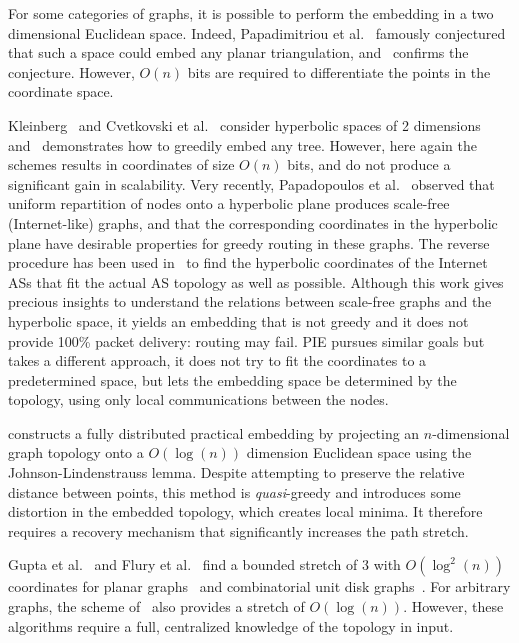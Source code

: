 \documentclass[conference]{IEEEtran}
\begin{document}
For some categories of graphs, it is possible to perform the embedding in a two dimensional Euclidean space. Indeed, Papadimitriou et al.~\cite{papadimitriou:conjecture} famously conjectured that such a space could embed any planar triangulation, and~\cite{moitra:greedy} confirms the conjecture. However, $O(n)$ bits are required to differentiate the points in the coordinate space.

Kleinberg~\cite{kleinberg:hyperbolic} and Cvetkovski et al.~\cite{Crovella:hyperbolic} consider hyperbolic spaces of 2 dimensions and~\cite{kleinberg:hyperbolic} demonstrates how to greedily embed any tree. However, here again the schemes results in coordinates of size $O(n)$ bits, and do not produce a significant gain in scalability. 
Very recently, Papadopoulos et al.~\cite{papadopoulos10} observed that uniform repartition of nodes onto a hyperbolic plane produces scale-free (Internet-like) graphs, and that the corresponding coordinates in the hyperbolic plane have desirable properties for greedy routing in these graphs. The reverse procedure has been used in~\cite{Krioukov:sustaining} to find the hyperbolic coordinates of the Internet ASs that fit the actual AS topology as well as possible. Although this work gives precious insights to understand the relations between scale-free graphs and the hyperbolic space, 
it yields an embedding that
is not greedy and it does not provide 100\% packet delivery: routing may fail. PIE pursues similar goals but takes a different approach,
it does not try to fit the coordinates to a predetermined space, but lets the embedding space be determined by the topology, using only local communications between the nodes.


\cite{Pei:greedy} constructs a fully distributed practical embedding by projecting an $n$-dimensional graph topology onto a $O(\log(n))$ dimension Euclidean space using the Johnson-Lindenstrauss lemma. Despite attempting to preserve the relative
distance between points, this method is \emph{quasi}-greedy and introduces some distortion in the embedded topology, which creates local minima. It therefore requires a recovery mechanism that significantly increases the path stretch.





Gupta et al.~\cite{gupta} and Flury et al.~\cite{greedy:flury} find a bounded stretch
of $3$ with $O(\log^2(n))$ coordinates for planar graphs~\cite{gupta} and
combinatorial unit disk graphs~\cite{greedy:flury}. For arbitrary graphs,
the scheme of~\cite{greedy:flury} also provides a stretch of $O(\log(n))$.
However, these algorithms require a full, centralized
knowledge of the topology in input.
\end{document}
